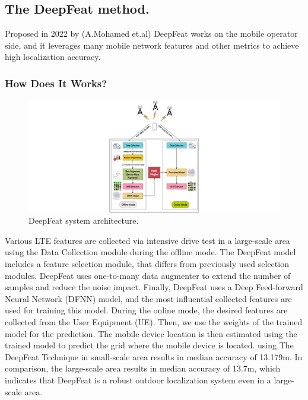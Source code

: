 \subsection{The DeepFeat method.}
Proposed in 2022 by (A.Mohamed et.al)\cite{amel} DeepFeat works on the mobile operator side, and it leverages many mobile network features and other metrics to achieve high localization accuracy.
\subsubsection{How Does It Works?}
\begin{figure}
    \centering
    \includegraphics[scale = 2]{images/access-gagraphic-3140292.jpg}
    \caption{DeepFeat system architecture.}
    \label{fig:my_label}
\end{figure}
Various LTE features are collected via intensive drive test in a large-scale area using the Data Collection module during the offline mode. The DeepFeat model includes a feature selection module, that differs from previously used selection modules. DeepFeat uses one-to-many data augmenter to extend the number of samples and reduce the noise impact. Finally, DeepFeat uses a Deep Feed-forward Neural Network (DFNN) model, and the most influential collected features are used for training this model. During the online mode, the desired features are collected from the User Equipment (UE). Then, we use the weights of the trained model for the prediction. The mobile device location is then estimated using the trained model to predict the grid where the mobile device is located.
using The DeepFeat Technique in  small-scale area results in median accuracy of 13.179m. In comparison, the large-scale area results in median accuracy of 13.7m, which indicates that DeepFeat is a robust outdoor localization system even in a large-scale area.



